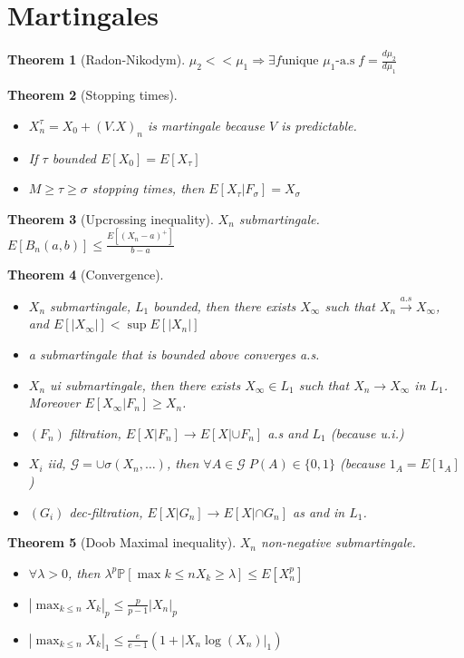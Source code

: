 \documentclass{article}
\newtheorem{theorem}{Theorem}
\begin{document}
\section{Martingales}
\begin{theorem}[Radon-Nikodym]
  $\mu_2 << \mu_1 \Rightarrow \exists f \text{unique $\mu_1$-a.s} \; f = \frac{d\mu_2}{d\mu_1}$
\end{theorem}
\begin{theorem}[Stopping times]
  \begin{itemize}
  \item $X_n^{\tau} = X_0 + (V.X)_n$ is martingale because $V$ is
    predictable.
  \item If $\tau$ bounded $E[X_0] = E[X_{\tau}]$
  \item $M \ge \tau \ge \sigma$ stopping times, then $E[X_{\tau} | F_{\sigma}] = X_{\sigma}$
  \end{itemize}
  
\end{theorem}
\begin{theorem}[Upcrossing inequality]
  $X_n$ submartingale. $E[B_n(a, b)] \le \frac{E[(X_n - a)^+]}{b - a}$
\end{theorem}
\begin{theorem}[Convergence]
  \begin{itemize}
  \item $X_n$ submartingale, $L_1$ bounded, then there exists  $X_{\infty}$ such that  $X_n \overset{a.s}{\rightarrow} X_{\infty}$, and  $E[|X_\infty|] < \sup E[|X_n|]$
  \item a submartingale that is bounded above converges a.s.
  \item $X_n$ ui submartingale, then there exists $X_{\infty} \in L_1$ such that $X_n \rightarrow X_{\infty}$ in $L_1$. Moreover $E[X_{\infty} | F_n] \ge X_n$.
  \item $(F_n)$ filtration, $E[X | F_n] \rightarrow E[X | \cup F_n]$ a.s and $L_1$ (because u.i.)
  \item $X_i$ iid, $\mathcal G = \cup \sigma(X_n, \ldots)$, then $\forall A \in \mathcal G \; P(A) \in \{0, 1\}$ (because $1_A = E[1_A]$)
  \item $(G_i)$ dec-filtration, $E[X | G_n ] \rightarrow E[X | \cap G_n]$ as and in $L_1$.
  \end{itemize}
\end{theorem}
\begin{theorem}[Doob Maximal inequality]
  $X_n$ non-negative submartingale.
  \begin{itemize}
  \item $\forall \lambda > 0$, then $\lambda^p \mathbb P[\max{k \le n} X_k \ge \lambda] \le E[X_n^p]$
  \item $|\max_{k \le n} X_k|_p \le \frac{p}{p-1} |X_n|_p$
  \item $|\max_{k \le n} X_k|_1 \le \frac{e}{e-1} (1 + |X_n\log(X_n)|_1)$
  \end{itemize}
\end{theorem}
\end{document}
